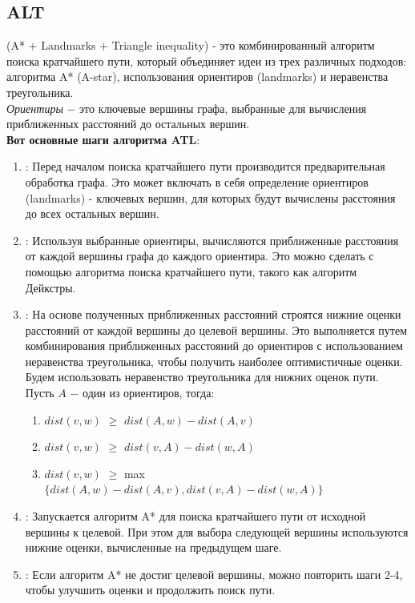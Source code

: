     \subsection{ALT}
         (A* + Landmarks + Triangle inequality) - это комбинированный алгоритм поиска кратчайшего пути, который объединяет идеи из трех различных подходов: алгоритма A* (A-star), использования ориентиров (landmarks) и неравенства треугольника.\\
        \textit{Ориентиры} $-$ это ключевые вершины графа, выбранные для вычисления приближенных расстояний до остальных вершин.\\

        \textbf{Вот основные шаги алгоритма ATL}:
        \begin{enumerate}
            \item {}: Перед началом поиска кратчайшего пути производится предварительная обработка графа. Это может включать в себя определение ориентиров (landmarks) - ключевых вершин, для которых будут вычислены расстояния до всех остальных вершин.
            \item {}: Используя выбранные ориентиры, вычисляются приближенные расстояния от каждой вершины графа до каждого ориентира. Это можно сделать с помощью алгоритма поиска кратчайшего пути, такого как алгоритм Дейкстры.
            \item {}: На основе полученных приближенных расстояний строятся нижние оценки расстояний от каждой вершины до целевой вершины. Это выполняется путем комбинирования приближенных расстояний до ориентиров с использованием неравенства треугольника, чтобы получить наиболее оптимистичные оценки.\\
            Будем использовать неравенство треугольника для нижних оценок пути. Пусть $A$ $-$ один из ориентиров, тогда:
            \begin{enumerate}[label={$\cdot$}]
                \item $dist(v, w)$ $\geq$ $dist(A, w) - dist(A, v)$
                \item $dist(v, w)$ $\geq$ $dist(v, A) - dist(w, A)$
                \item $dist(v, w)$ $\geq$ max$\{ dist(A, w) - dist(A, v), dist(v, A) - dist(w, A)\}$
            \end{enumerate}
            \item {}: Запускается алгоритм A* для поиска кратчайшего пути от исходной вершины к целевой. При этом для выбора следующей вершины используются нижние оценки, вычисленные на предыдущем шаге.
            \item {}: Если алгоритм A* не достиг целевой вершины, можно повторить шаги 2-4, чтобы улучшить оценки и продолжить поиск пути.\\
        \end{enumerate}

